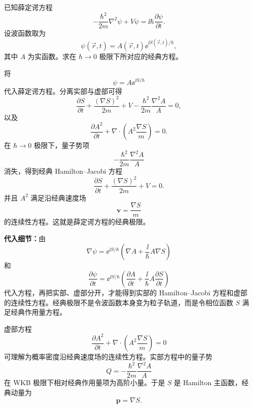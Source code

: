\begin{question}[薛定谔方程的经典极限]
已知薛定谔方程
\[
  -\frac{\hbar^2}{2m}\nabla^2\psi+V\psi=\ii\hbar\frac{\partial\psi}{\partial t}.
\]
设波函数取为
\[
  \psi(\vec r,t)=A(\vec r,t)\ee^{\ii S(\vec r,t)/\hbar},
\]
其中 $A$ 为实函数。求在 $\hbar\to0$ 极限下所对应的经典方程。

\begin{solution}
将
\[
  \psi=A\ee^{\ii S/\hbar}
\]
代入薛定谔方程。分离实部与虚部可得
\[
  \frac{\partial S}{\partial t}+\frac{(\nabla S)^2}{2m}+V
  -\frac{\hbar^2}{2m}\frac{\nabla^2A}{A}=0,
\]
以及
\[
  \frac{\partial A^2}{\partial t}
  +\nabla\cdot\left(A^2\frac{\nabla S}{m}\right)=0.
\]
在 $\hbar\to0$ 极限下，量子势项
\[
  -\frac{\hbar^2}{2m}\frac{\nabla^2A}{A}
\]
消失，得到经典 Hamilton--Jacobi 方程
\[
  \boxed{\frac{\partial S}{\partial t}+\frac{(\nabla S)^2}{2m}+V=0}.
\]
并且 $A^2$ 满足沿经典速度场
\[
  \boldsymbol v=\frac{\nabla S}{m}
\]
的连续性方程。这就是薛定谔方程的经典极限。


\medskip
\textbf{代入细节：}由
\[
  \nabla\psi=\ee^{\ii S/\hbar}\left(\nabla A+\frac{\ii}{\hbar}A\nabla S\right)
\]
和
\[
  \frac{\partial\psi}{\partial t}=\ee^{\ii S/\hbar}
  \left(\frac{\partial A}{\partial t}+\frac{\ii}{\hbar}A\frac{\partial S}{\partial t}\right)
\]
代入方程，再把实部、虚部分开，才能得到实部的 Hamilton--Jacobi 方程和虚部的连续性方程。经典极限不是令波函数本身变为粒子轨道，而是令相位函数 $S$ 满足经典作用量方程。


\medskip
虚部方程
\[
  \frac{\partial A^2}{\partial t}+\nabla\cdot\left(A^2\frac{\nabla S}{m}\right)=0
\]
可理解为概率密度沿经典速度场的连续性方程。实部方程中的量子势
\[
  Q=-\frac{\hbar^2}{2m}\frac{\nabla^2A}{A}
\]
在 WKB 极限下相对经典作用量项为高阶小量。于是 $S$ 是 Hamilton 主函数，经典动量为
\[
  \boldsymbol p=\nabla S.
\]
\end{solution}
\end{question}

